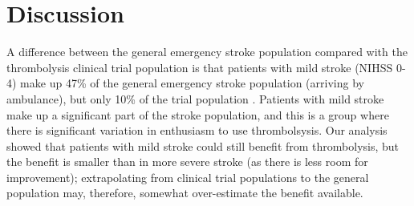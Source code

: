 \section{Discussion}


A difference between the general emergency stroke population compared with the thrombolysis clinical trial population is that patients with mild stroke (NIHSS 0-4) make up 47\% of the general emergency stroke population (arriving by ambulance), but only 10\% of the trial population \cite{emberson_effect_2014}. Patients with mild stroke make up a significant part of the stroke population, and this is a group where there is significant variation in enthusiasm to use thrombolsysis. Our analysis showed that patients with mild stroke could still benefit from thrombolysis, but the benefit is smaller than in more severe stroke (as there is less room for improvement); extrapolating from clinical trial populations to the general population may, therefore, somewhat over-estimate the benefit available.